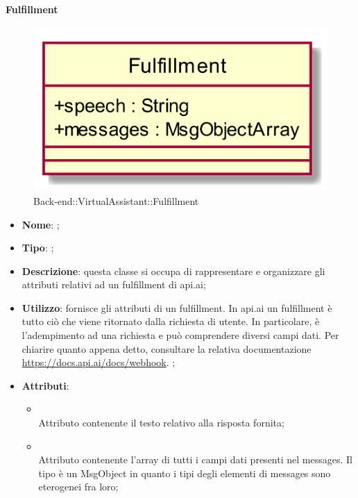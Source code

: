 \hypertarget{Fulfillment_label}{\paragraph{Fulfillment}}
\begin{figure}[h]
	\centering
	\includegraphics[width=\textwidth,height=\textheight,keepaspectratio]{images/ClassFulfillment.png}
	\caption{Back-end::VirtualAssistant::Fulfillment}
\end{figure}
\begin{itemize}
	\item \textbf{Nome}: ;
	\item \textbf{Tipo}: ;
	\item \textbf{Descrizione}: questa classe si occupa di rappresentare e organizzare gli attributi relativi ad un fulfillment di api.ai;
	\item \textbf{Utilizzo}: fornisce gli attributi di un fulfillment.
In api.ai un fulfillment è tutto ciò che viene ritornato dalla richiesta di utente. In particolare, è l'adempimento ad una richiesta e può comprendere diversi campi dati.
Per chiarire quanto appena detto, consultare la relativa documentazione \url{https://docs.api.ai/docs/webhook}.
;
	\item \textbf{Attributi}:
	\begin{itemize}
		\item[]  \\
		Attributo contenente il testo relativo alla risposta fornita;
		\item[]  \\
		Attributo contenente l'array di tutti i campi dati presenti nel messages.
Il tipo è un MsgObject in quanto i tipi degli elementi di messages sono eterogenei fra loro;
	\end{itemize}
\end{itemize}

